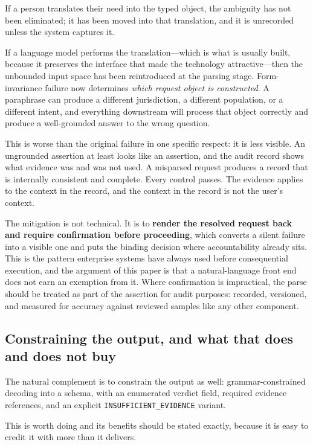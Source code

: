 If a person translates their need into the typed object, the ambiguity has not been
eliminated; it has been moved into that translation, and it is unrecorded unless the
system captures it.

If a language model performs the translation---which is what is usually built,
because it preserves the interface that made the technology attractive---then the
unbounded input space has been reintroduced at the parsing stage. Form-invariance
failure now determines \emph{which request object is constructed}. A paraphrase can
produce a different jurisdiction, a different population, or a different intent, and
everything downstream will process that object correctly and produce a well-grounded
answer to the wrong question.

This is worse than the original failure in one specific respect: it is less visible.
An ungrounded assertion at least looks like an assertion, and the audit record shows
what evidence was and was not used. A misparsed request produces a record that is
internally consistent and complete. Every control passes. The evidence applies to the
context in the record, and the context in the record is not the user's context.

The mitigation is not technical. It is to \textbf{render the resolved request back and
require confirmation before proceeding}, which converts a silent failure into a
visible one and puts the binding decision where accountability already sits. This is
the pattern enterprise systems have always used before consequential execution, and
the argument of this paper is that a natural-language front end does not earn an
exemption from it. Where confirmation is impractical, the parse should be treated as
part of the assertion for audit purposes: recorded, versioned, and measured for
accuracy against reviewed samples like any other component.

\subsection{Constraining the output, and what that does and does not buy}
\label{sec:constrained-output}

The natural complement is to constrain the output as well: grammar-constrained
decoding into a schema, with an enumerated verdict field, required evidence
references, and an explicit \texttt{INSUFFICIENT\_EVIDENCE} variant.

This is worth doing and its benefits should be stated exactly, because it is easy to
credit it with more than it delivers.

